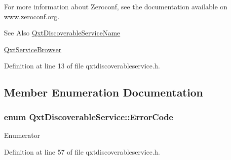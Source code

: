 For more information about Zeroconf, see the documentation available on www.\-zeroconf.\-org.

\begin{DoxySeeAlso}{See Also}
\hyperlink{class_qxt_discoverable_service_name}{Qxt\-Discoverable\-Service\-Name} 

\hyperlink{class_qxt_service_browser}{Qxt\-Service\-Browser} 
\end{DoxySeeAlso}


Definition at line 13 of file qxtdiscoverableservice.\-h.



\subsection{Member Enumeration Documentation}
\hypertarget{class_qxt_discoverable_service_a0ea63c28bb86b71ff278c6617708a2f3}{
\subsubsection[{Error\-Code}]{\setlength{\rightskip}{0pt plus 5cm}enum {\bf Qxt\-Discoverable\-Service\-::\-Error\-Code}}}\label{class_qxt_discoverable_service_a0ea63c28bb86b71ff278c6617708a2f3}
\begin{Desc}
\item[Enumerator]\par
\begin{description}
\item[{\em 
\hypertarget{class_qxt_discoverable_service_a0ea63c28bb86b71ff278c6617708a2f3a85f221acd82ad2d426b5034f47a09eb3}{No\-Error}\label{class_qxt_discoverable_service_a0ea63c28bb86b71ff278c6617708a2f3a85f221acd82ad2d426b5034f47a09eb3}
}]\end{description}
\end{Desc}


Definition at line 57 of file qxtdiscoverableservice.\-h.

